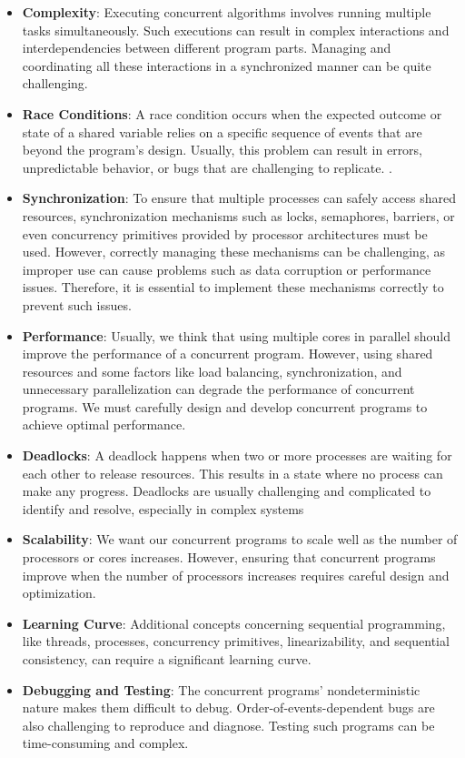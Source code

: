 \begin{itemize}
  \item \textbf{Complexity}: Executing concurrent algorithms involves running multiple tasks simultaneously. Such executions can result in complex interactions and interdependencies between different program parts. Managing and coordinating all these interactions in a synchronized manner can be quite challenging.
  \item \textbf{Race Conditions}: A race condition occurs when the expected outcome or state of a shared variable relies on a specific sequence of events that are beyond the program's design. Usually, this problem can result in errors, unpredictable behavior, or bugs that are challenging to replicate.
.  \item \textbf{Synchronization}: To ensure that multiple processes can safely access shared resources, synchronization mechanisms such as locks, semaphores, barriers, or even concurrency primitives provided by processor architectures must be used. However, correctly managing these mechanisms can be challenging, as improper use can cause problems such as data corruption or performance issues. Therefore, it is essential to implement these mechanisms correctly to prevent such issues.
  \item \textbf{Performance}: Usually, we think that using multiple cores in parallel should improve the performance of a concurrent program. However, using shared resources and some factors like load balancing, synchronization, and unnecessary parallelization can degrade the performance of concurrent programs. We must carefully design and develop concurrent programs to achieve optimal performance.
  \item \textbf{Deadlocks}: A deadlock happens when two or more processes are waiting for each other to release resources. This results in a state where no process can make any progress. Deadlocks are usually challenging and complicated to identify and resolve, especially in complex systems
  \item \textbf{Scalability}: We want our concurrent programs to scale well as the number of processors or cores increases. However, ensuring that concurrent programs improve when the number of processors increases requires careful design and optimization.
  \item \textbf{Learning Curve}: Additional concepts concerning sequential programming, like threads, processes, concurrency primitives, linearizability, and sequential consistency, can require a significant learning curve.
  \item \textbf{Debugging and Testing}: The concurrent programs' nondeterministic nature makes them difficult to debug. Order-of-events-dependent bugs are also challenging to reproduce and diagnose. Testing such programs can be time-consuming and complex.

\end{itemize}

